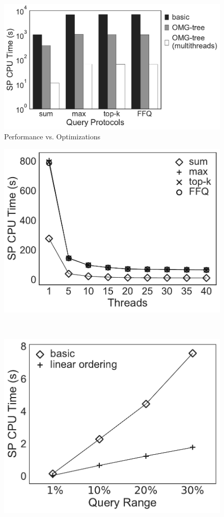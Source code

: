 \begin{figure}[t]
  \centering
  \includegraphics[width=0.5\linewidth]{exp-figs/aggregate-queries/opt.pdf}
  \caption{Performance vs. Optimizations}\label{fig:aggregate-queries:opt}
\end{figure}

\begin{figure}[t]
  \begin{minipage}[t]{0.5\linewidth}
    \centering
    \includegraphics[width=.8\linewidth]{exp-figs/aggregate-queries/threads.pdf}
    \label{fig:aggregate-queries:mt}
  \end{minipage}~%
  \begin{minipage}[t]{0.5\linewidth}
    \centering
    \includegraphics[width=.75\linewidth]{exp-figs/aggregate-queries/linear.pdf}
    \label{fig:aggregate-queries:linear}
  \end{minipage}
\end{figure}

